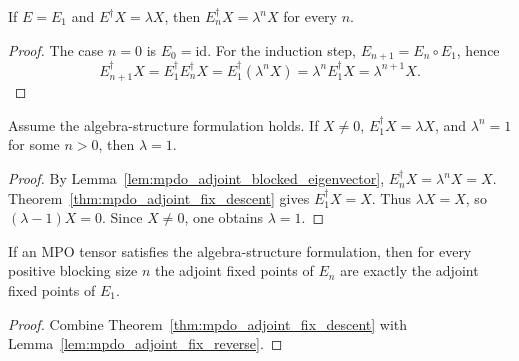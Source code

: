 \begin{lemma}%
    \label{lem:mpdo_adjoint_blocked_eigenvector}
    \leanok
    If $E=E_1$ and $E^\dagger X=\lambda X$, then
    $E_n^\dagger X=\lambda^n X$ for every $n$.
\end{lemma}
\begin{proof}\leanok
    The case $n=0$ is $E_0=\mathrm{id}$. For the induction step,
    $E_{n+1}=E_n\circ E_1$, hence
    \[
        E_{n+1}^{\dagger}X
        = E_1^{\dagger}E_n^{\dagger}X
        = E_1^{\dagger}(\lambda^n X)
        = \lambda^n E_1^{\dagger}X
        = \lambda^{n+1}X.
    \]
\end{proof}

\begin{theorem}%
    \label{thm:mpdo_algebra_root_of_unity_eigenvalue}
    \leanok
    Assume the algebra-structure formulation holds. If $X\ne 0$,
    $E_1^\dagger X=\lambda X$, and $\lambda^n=1$ for some $n>0$, then
    $\lambda=1$.
\end{theorem}
\begin{proof}\leanok
    By Lemma~\ref{lem:mpdo_adjoint_blocked_eigenvector},
    $E_n^\dagger X=\lambda^n X=X$. Theorem~\ref{thm:mpdo_adjoint_fix_descent} gives
    $E_1^\dagger X=X$. Thus $\lambda X=X$, so $(\lambda-1)X=0$. Since
    $X\ne0$, one obtains $\lambda=1$.
\end{proof}

\begin{theorem}%
    \label{thm:mpdo_adjoint_fix_equality_from_algebra}
    \leanok
    If an MPO tensor satisfies the algebra-structure formulation, then for
    every positive blocking size $n$ the adjoint fixed points of $E_n$ are
    exactly the adjoint fixed points of $E_1$.
\end{theorem}
\begin{proof}\leanok
    Combine Theorem~\ref{thm:mpdo_adjoint_fix_descent} with
    Lemma~\ref{lem:mpdo_adjoint_fix_reverse}.
\end{proof}

